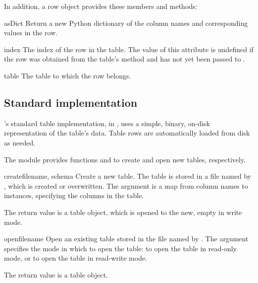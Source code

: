 In addition, a row object provides these members and methods:

\begin{methoddesc}{asDict}{}
 Return a new Python dictionary of the column names and corresponding
 values in the row.
\end{methoddesc}

\begin{memberdesc}{index}
 \readonly The index of the row in the table.  The value of this
 attribute is undefined if the row was obtained from the table's
  method and has not yet been passed to .
\end{memberdesc}

\begin{memberdesc}{table}
 \readonly The table to which the row belongs.
\end{memberdesc}


\subsection{Standard implementation}

\pyhep's standard table implementation, in , uses a
simple, binary, on-disk representation of the table's data.  Table rows
are automatically loaded from disk as needed.

The  module provides functions  and
 to create and open new tables, respectively.

\begin{funcdesc}{create}{filename, schema}
 Create a new table.  The table is stored in a file named by
 , which is created or overwritten.  The 
 argument is a map from column names to  instances,
 specifying the columns in the table.

 The return value is a table object, which is opened to the new, empty
 in write mode.
\end{funcdesc}

\begin{funcdesc}{open}{filename}
 Open an existing table stored in the file named by .  The
  argument specifies the mode in which to open the table:
  to open the table in read-only mode, or 
 to open the table in read-write mode.

 The return value is a table object.
\end{funcdesc}

